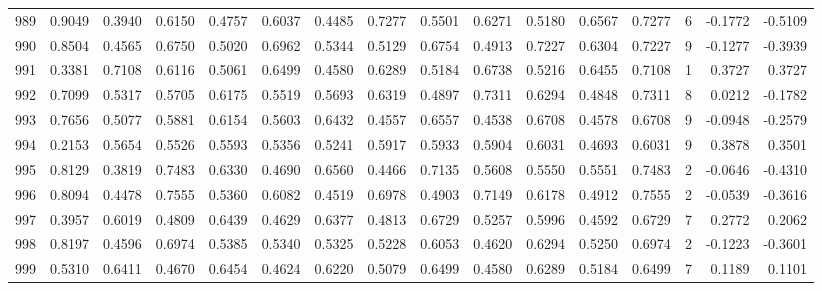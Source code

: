 \begin{tabular}{lrrrrrrrrrrrrrrr}
989 &      0.9049 &  0.3940 &  0.6150 &  0.4757 &  0.6037 &  0.4485 &  0.7277 &  0.5501 &  0.6271 &  0.5180 &   0.6567 &     0.7277 &      6 &                   -0.1772 &                    -0.5109 \\
990 &      0.8504 &  0.4565 &  0.6750 &  0.5020 &  0.6962 &  0.5344 &  0.5129 &  0.6754 &  0.4913 &  0.7227 &   0.6304 &     0.7227 &      9 &                   -0.1277 &                    -0.3939 \\
991 &      0.3381 &  0.7108 &  0.6116 &  0.5061 &  0.6499 &  0.4580 &  0.6289 &  0.5184 &  0.6738 &  0.5216 &   0.6455 &     0.7108 &      1 &                    0.3727 &                     0.3727 \\
992 &      0.7099 &  0.5317 &  0.5705 &  0.6175 &  0.5519 &  0.5693 &  0.6319 &  0.4897 &  0.7311 &  0.6294 &   0.4848 &     0.7311 &      8 &                    0.0212 &                    -0.1782 \\
993 &      0.7656 &  0.5077 &  0.5881 &  0.6154 &  0.5603 &  0.6432 &  0.4557 &  0.6557 &  0.4538 &  0.6708 &   0.4578 &     0.6708 &      9 &                   -0.0948 &                    -0.2579 \\
994 &      0.2153 &  0.5654 &  0.5526 &  0.5593 &  0.5356 &  0.5241 &  0.5917 &  0.5933 &  0.5904 &  0.6031 &   0.4693 &     0.6031 &      9 &                    0.3878 &                     0.3501 \\
995 &      0.8129 &  0.3819 &  0.7483 &  0.6330 &  0.4690 &  0.6560 &  0.4466 &  0.7135 &  0.5608 &  0.5550 &   0.5551 &     0.7483 &      2 &                   -0.0646 &                    -0.4310 \\
996 &      0.8094 &  0.4478 &  0.7555 &  0.5360 &  0.6082 &  0.4519 &  0.6978 &  0.4903 &  0.7149 &  0.6178 &   0.4912 &     0.7555 &      2 &                   -0.0539 &                    -0.3616 \\
997 &      0.3957 &  0.6019 &  0.4809 &  0.6439 &  0.4629 &  0.6377 &  0.4813 &  0.6729 &  0.5257 &  0.5996 &   0.4592 &     0.6729 &      7 &                    0.2772 &                     0.2062 \\
998 &      0.8197 &  0.4596 &  0.6974 &  0.5385 &  0.5340 &  0.5325 &  0.5228 &  0.6053 &  0.4620 &  0.6294 &   0.5250 &     0.6974 &      2 &                   -0.1223 &                    -0.3601 \\
999 &      0.5310 &  0.6411 &  0.4670 &  0.6454 &  0.4624 &  0.6220 &  0.5079 &  0.6499 &  0.4580 &  0.6289 &   0.5184 &     0.6499 &      7 &                    0.1189 &                     0.1101 \\
\bottomrule
\end{tabular}
